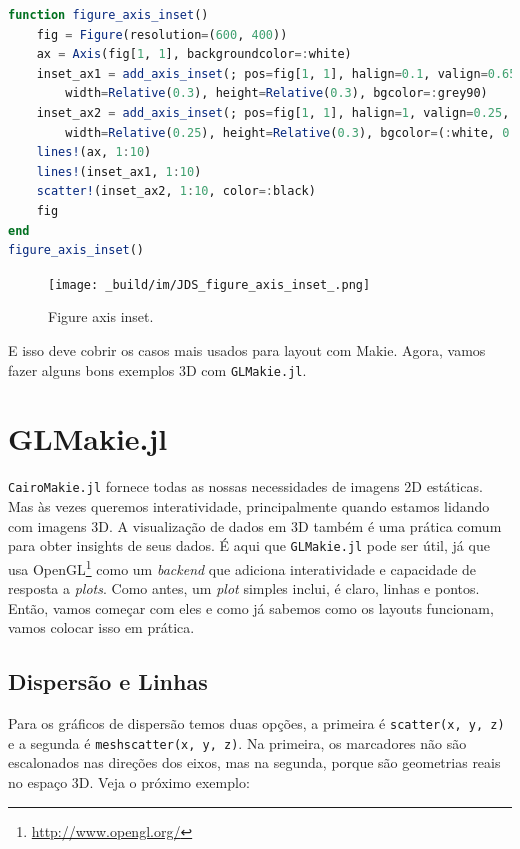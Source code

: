 \documentclass[
  notoc %
]{tufte-book}
\DeclareRobustCommand{\href}[2]{#2\footnote{\url{#1}}}
\newcommand{\passthrough}[1]{#1}
\begin{document}
\begin{lstlisting}[language=Julia]
function figure_axis_inset()
    fig = Figure(resolution=(600, 400))
    ax = Axis(fig[1, 1], backgroundcolor=:white)
    inset_ax1 = add_axis_inset(; pos=fig[1, 1], halign=0.1, valign=0.65,
        width=Relative(0.3), height=Relative(0.3), bgcolor=:grey90)
    inset_ax2 = add_axis_inset(; pos=fig[1, 1], halign=1, valign=0.25,
        width=Relative(0.25), height=Relative(0.3), bgcolor=(:white, 0.65))
    lines!(ax, 1:10)
    lines!(inset_ax1, 1:10)
    scatter!(inset_ax2, 1:10, color=:black)
    fig
end
figure_axis_inset()
\end{lstlisting}

\begin{figure}
\hypertarget{fig:figure_axis_inset}{%
\centering
\texttt{[image: \_build/im/JDS\_figure\_axis\_inset\_.png]}
\caption{Figure axis inset.}\label{fig:figure_axis_inset}
}
\end{figure}

E isso deve cobrir os casos mais usados para layout com Makie. Agora,
vamos fazer alguns bons exemplos 3D com
\passthrough{\lstinline!GLMakie.jl!}.

\hypertarget{sec:glmakie}{%
\section{GLMakie.jl}\label{sec:glmakie}}

\passthrough{\lstinline!CairoMakie.jl!} fornece todas as nossas
necessidades de imagens 2D estáticas. Mas às vezes queremos
interatividade, principalmente quando estamos lidando com imagens 3D. A
visualização de dados em 3D também é uma prática comum para obter
insights de seus dados. É aqui que \passthrough{\lstinline!GLMakie.jl!}
pode ser útil, já que usa \href{http://www.opengl.org/}{OpenGL} como um
\emph{backend} que adiciona interatividade e capacidade de resposta a
\emph{plots}. Como antes, um \emph{plot} simples inclui, é claro, linhas
e pontos. Então, vamos começar com eles e como já sabemos como os
layouts funcionam, vamos colocar isso em prática.

\hypertarget{dispersuxe3o-e-linhas}{%
\subsection{Dispersão e Linhas}\label{dispersuxe3o-e-linhas}}

Para os gráficos de dispersão temos duas opções, a primeira é
\passthrough{\lstinline!scatter(x, y, z)!} e a segunda é
\passthrough{\lstinline!meshscatter(x, y, z)!}. Na primeira, os
marcadores não são escalonados nas direções dos eixos, mas na segunda,
porque são geometrias reais no espaço 3D. Veja o próximo exemplo:
\end{document}
